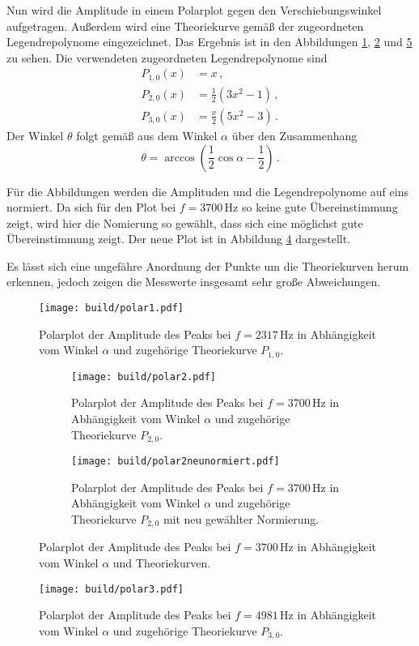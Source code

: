 Nun wird die Amplitude in einem Polarplot gegen den Verschiebungswinkel aufgetragen.
Außerdem wird eine Theoriekurve gemäß der zugeordneten Legendrepolynome eingezeichnet.
Das Ergebnis ist in den Abbildungen \ref{fig:polar1}, \ref{fig:polar2} und
\ref{fig:polar3} zu sehen. Die verwendeten zugeordneten Legendrepolynome sind
\begin{align*}
	P_{1,0}(x)&=x \,,\\
	P_{2,0}(x)&=\frac{1}{2}(3x^2-1) \,,\\
	P_{3,0}(x)&=\frac{x}{2}(5x^2-3) \,.
\end{align*}
Der Winkel $\theta$ folgt gemäß \cite{Formel} aus dem Winkel $\alpha$ über den Zusammenhang
\begin{equation*}
	\theta=\arccos\left(\frac{1}{2}\cos{\alpha}-\frac{1}{2}\right) \,.
\end{equation*}

Für die Abbildungen werden die Amplituden und die Legendrepolynome auf eins normiert.
Da sich für den Plot bei $f=3700$\,Hz so keine gute Übereinstimmung zeigt, wird hier
die Nomierung so gewählt, dass sich eine möglichst gute Übereinstimmung zeigt.
Der neue Plot ist in Abbildung \ref{fig:polar2neu} dargestellt.

Es lässt sich eine ungefähre Anordnung der Punkte um die Theoriekurven herum erkennen,
jedoch zeigen die Messwerte insgesamt sehr große Abweichungen.
\begin{figure}[h!]
  \centering
  \texttt{[image: build/polar1.pdf]}
  \caption{Polarplot der Amplitude des Peaks bei $f=2317$\,Hz in Abhängigkeit vom
  Winkel $\alpha$ und zugehörige Theoriekurve $P_{1,0}$.}
  \label{fig:polar1}
\end{figure}
\begin{figure}[h!]
  \centering
  \begin{subfigure}{0.49\textwidth}
  	\centering
  	\texttt{[image: build/polar2.pdf]}
  	\caption{Polarplot der Amplitude des Peaks bei $f=3700$\,Hz in Abhängigkeit vom
  	Winkel $\alpha$ und zugehörige Theoriekurve $P_{2,0}$.}
  	\label{fig:polar2}
	\end{subfigure}
	\begin{subfigure}{0.49\textwidth}
  	\centering
  	\texttt{[image: build/polar2neunormiert.pdf]}
  	\caption{Polarplot der Amplitude des Peaks bei $f=3700$\,Hz in Abhängigkeit vom
  	Winkel $\alpha$ und zugehörige Theoriekurve $P_{2,0}$ mit neu gewählter Normierung.}
  	\label{fig:polar2neu}
	\end{subfigure}
	\caption{Polarplot der Amplitude des Peaks bei $f=3700$\,Hz in Abhängigkeit vom
	Winkel $\alpha$ und Theoriekurven.}
\end{figure}
\begin{figure}[h!]
  \centering
  \texttt{[image: build/polar3.pdf]}
  \caption{Polarplot der Amplitude des Peaks bei $f=4981$\,Hz in Abhängigkeit vom
  Winkel $\alpha$ und zugehörige Theoriekurve $P_{3,0}$.}
  \label{fig:polar3}
\end{figure}
